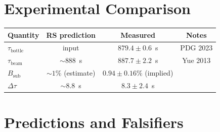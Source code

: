 \documentclass[12pt,a4paper]{article}
\theoremstyle{definition}
\theoremstyle{remark}
\begin{document}
\section{Experimental Comparison}
\label{sec:compare}

\begin{center}
\renewcommand{\arraystretch}{1.15}
\begin{tabular}{lccc}
\toprule
\textbf{Quantity} & \textbf{RS prediction} & \textbf{Measured} & \textbf{Notes}\\
\midrule
$\tau_{\mathrm{bottle}}$ & input & $879.4 \pm 0.6$~s & PDG 2023 \\
$\tau_{\mathrm{beam}}$ & $\sim 888$~s & $887.7 \pm 2.2$~s & Yue 2013 \\
$B_{\mathrm{sub}}$ & $\sim 1\%$ (estimate) & $0.94 \pm 0.16\%$ (implied) & \\
$\Delta\tau$ & $\sim 8.8$~s & $8.3 \pm 2.4$~s & \\
\bottomrule
\end{tabular}
\end{center}

\section{Predictions and Falsifiers}
\label{sec:predict}
\end{document}
